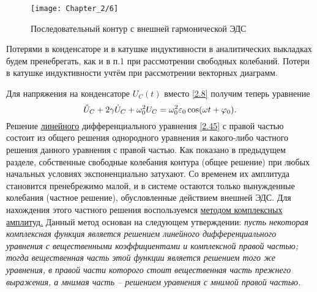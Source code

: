 \begin{figure}[h!]
	\centering
	\texttt{[image: Chapter\_2/6]}
	\caption{Последовательный контур с внешней гармонической ЭДС}
	\label{fig4}
\end{figure}

Потерями в конденсаторе и в катушке индуктивности в аналитических выкладках будем пренебрегать, как и в п.1 при рассмотрении свободных колебаний. Потери в катушке индуктивности учтём при рассмотрении векторных диаграмм.


Для напряжения на конденсаторе $U_C(t)$ вместо \eqref{2.8} получим теперь уравнение
\begin{equation}\eqmark{2.45}
\ddot{U}_C+2\gamma \dot{U}_C+\omega_0^2U_C=\omega_0^2\varepsilon_0\cos(\omega t+ \varphi_0).
\end{equation}
Решение \underline{линейного} дифференциального уравнения \eqref{2.45} с правой частью состоит из общего решения однородного уравнения и какого-либо частного решения данного уравнения с правой частью. Как показано в предыдущем разделе, собственные свободные колебания контура (общее решение) при любых начальных условиях экспоненциально затухают. Со временем их амплитуда становится пренебрежимо малой, и в системе остаются только вынужденные колебания (частное решение), обусловленные действием внешней ЭДС. Для нахождения этого частного решения воспользуемся \underline{методом комплексных амплитуд.} Данный метод основан на следующем утверждении: \emph{пусть некоторая комплексная функция является решением линейного дифференциального уравнения с вещественными коэффициентами и комплексной правой частью; тогда вещественная часть этой функции является решением того же уравнения, в правой части которого стоит вещественная часть прежнего выражения, а мнимая часть – решением уравнения с мнимой правой частью.}

